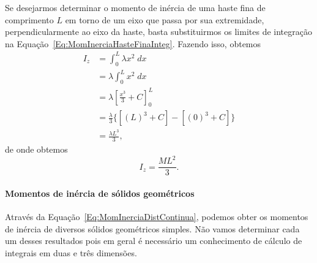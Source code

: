 Se desejarmos determinar o momento de inércia de uma haste fina de comprimento $L$ em torno de um eixo que passa por sua extremidade, perpendicularmente ao eixo da haste, basta substituirmos os limites de integração na Equação~\eqref{Eq:MomInerciaHasteFinaInteg}. Fazendo isso, obtemos
\begin{align}
    I_z &= \int_{0}^{L} \lambda x^2 \; dx \label{Eq:MomInerciaHasteFinaInteg}\\
    &= \lambda \int_{0}^{L} x^2 \; dx \\
    &= \lambda \left[\frac{x^3}{3} + C\right]_{0}^{L} \\
    &= \frac{\lambda}{3} \{[(L)^3 + C] - [(0)^3 + C] \} \\
    &= \frac{\lambda L^3}{3},
\end{align}
%
de onde obtemos
\begin{equation}
    I_z = \frac{ML^2}{3}.
\end{equation}

\paragraph{Momentos de inércia de sólidos geométricos}

Através da Equação~\eqref{Eq:MomInerciaDistContinua}, podemos obter os momentos de inércia de diversos sólidos geométricos simples. Não vamos determinar cada um desses resultados pois em geral é necessário um conhecimento de cálculo de integrais em duas e três dimensões.


